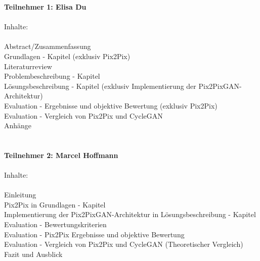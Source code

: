 \textbf{Teilnehmer 1:  Elisa Du} \\
\\
 Inhalte: \\
\\ Abstract/Zusammenfassung
\\ Grundlagen - Kapitel (exklusiv Pix2Pix)
\\ Literaturreview
\\ Problembeschreibung - Kapitel
\\ Lösungsbeschreibung - Kapitel (exklusiv Implementierung der Pix2PixGAN-Architektur)
\\ Evaluation - Ergebnisse und objektive Bewertung  (exklusiv Pix2Pix)
\\ Evaluation - Vergleich von Pix2Pix und CycleGAN
\\ Anhänge
\\ 
\\
\\
\textbf{Teilnehmer 2: Marcel Hoffmann} \\
\\
 Inhalte: \\
\\ Einleitung
\\ Pix2Pix in Grundlagen - Kapitel
\\ Implementierung der Pix2PixGAN-Architektur in Lösungsbeschreibung - Kapitel
\\ Evaluation - Bewertungskriterien
\\ Evaluation - Pix2Pix Ergebnisse und objektive Bewertung
\\ Evaluation - Vergleich von Pix2Pix und CycleGAN (Theoretischer Vergleich)
\\ Fazit und Ausblick
\\
\\
\\
